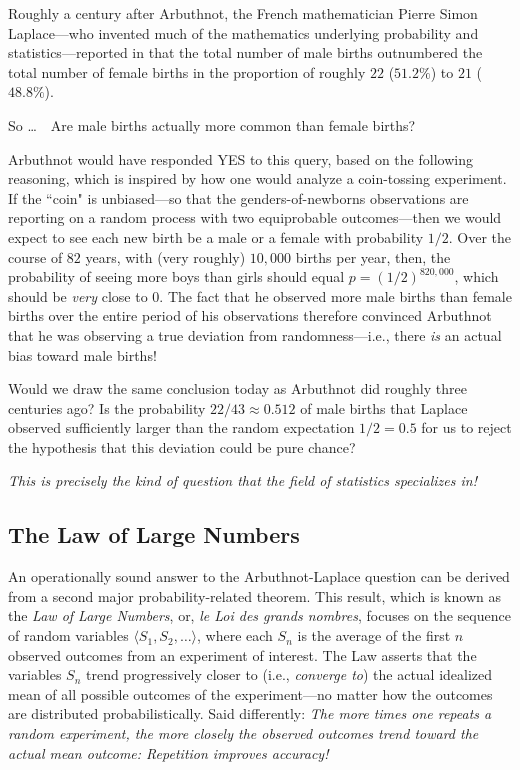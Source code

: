 \smallskip

Roughly a century after Arbuthnot, the French mathematician Pierre Simon Laplace---who invented much of the mathematics underlying probability and statistics---reported in \cite{Laplace} that the total number of male births outnumbered the total number of female births in the proportion of roughly $22$ ($51.2\%$) to $21$ ($48.8\%$).

\medskip

\noindent
So \ldots \ \ Are male births actually more common than female births?

\medskip

\noindent
Arbuthnot would have responded YES to this query, based on the following reasoning, which is inspired by how one would analyze a coin-tossing experiment.  If the ``coin" is unbiased---so that the genders-of-newborns observations are reporting on a random process with two equiprobable outcomes---then we would expect to see each new birth be a male or a female with probability $1/2$.  Over the course of $82$ years, with (very roughly) $10,000$ births per year, then, the probability of seeing more boys than girls should equal $p=(1/2)^{820,000}$, which should be {\em very} close to $0$.  The fact that he observed more male births than female births over the entire period of his observations therefore convinced Arbuthnot that he was observing a true deviation from randomness---i.e., there {\em is} an actual bias toward male births!

\medskip

Would we draw the same conclusion today as Arbuthnot did roughly three centuries ago?  Is the probability $22/43 \approx 0.512$ of male births that Laplace observed sufficiently larger than the random expectation $1/2 = 0.5$ for us to reject the hypothesis that this deviation could be pure chance?

\medskip

{\em This is precisely the kind of question that the field of statistics specializes in!}

\subsection{The Law of Large Numbers}
\label{sec:Large-Numbers}

 

An operationally sound answer to the Arbuthnot-Laplace question can be derived from a second major probability-related theorem.  This result, which is known as the {\it Law of Large Numbers}, or, {\it le Loi des grands nombres}, focuses on the sequence of random variables $\langle S_1, S_2, \ldots \rangle$, where each $S_n$ is the average of the first $n$ observed outcomes from an experiment of interest.  The Law asserts that the variables $S_n$ trend progressively closer to (i.e., {\em converge to}) the actual idealized mean of all possible outcomes of the experiment---no matter how the outcomes are distributed probabilistically.  Said differently: {\em The more times one repeats a random experiment, the more closely the observed outcomes trend toward the actual mean outcome:  Repetition improves accuracy!}

